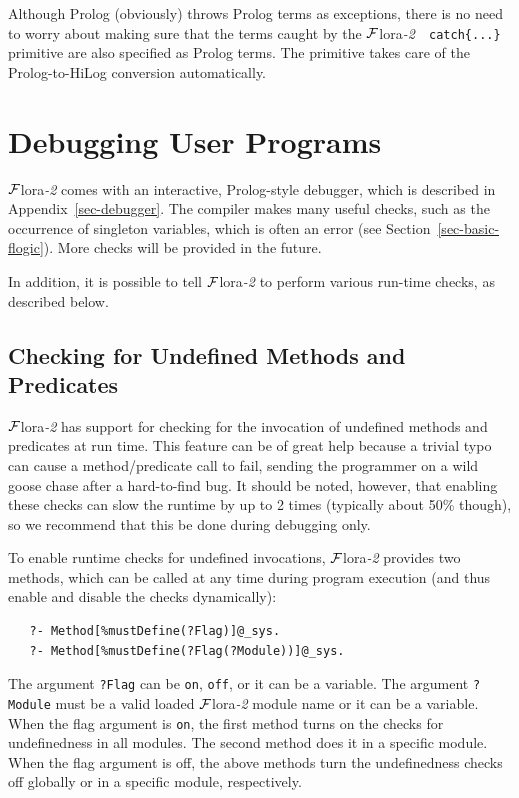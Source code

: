 \documentclass[11pt]{article}
\newcommand{\FLORA}{{\mbox{\sc ${\cal F}${lora}\rm\emph{-2}}}\xspace}
\begin{document}
Although Prolog (obviously) throws Prolog terms as exceptions, there is no
need to worry about making sure that the terms caught by the \FLORA\, {\tt
  catch\{...\}} primitive are also specified as Prolog terms. The primitive
takes care of the Prolog-to-HiLog conversion automatically.



\section{Debugging User Programs}\label{sec-debugging}

\FLORA comes with an interactive, Prolog-style debugger, which is described
in Appendix~\ref{sec-debugger}. The compiler makes many useful checks, such
as the occurrence of singleton variables, which is often an error (see
Section~\ref{sec-basic-flogic}). More checks will be provided in the future.

In addition, it is possible to tell \FLORA to perform various run-time
checks, as described below.

\subsection{Checking for Undefined Methods and Predicates}\label{sec-undef}

\FLORA has support for checking for the invocation of undefined methods and
predicates at run time. This feature can be of great help because a trivial
typo can cause a method/predicate call to fail, sending the programmer on a
wild goose chase after a hard-to-find bug. It should be noted, however,
that enabling these checks can slow the runtime by up to 2 times (typically
about 50\% though), so we recommend that this be done during debugging only.

To enable runtime checks for undefined invocations, \FLORA provides two
methods, which can be called at any time during program execution (and thus
enable and disable the checks dynamically):
\begin{verbatim}
   ?- Method[%mustDefine(?Flag)]@_sys.
   ?- Method[%mustDefine(?Flag(?Module))]@_sys.
\end{verbatim}
The argument {\tt ?Flag} can be {\tt on}, {\tt off}, or it can be a variable.
The argument {\tt ?Module} must be a valid loaded \FLORA module name 
or it can be a variable. When the flag argument is {\tt on}, the first
method turns on the checks for undefinedness in all modules. The second
method does it in a specific module. When the flag argument is off, the
above methods turn the undefinedness checks off globally or in a specific
module, respectively.
\end{document}
